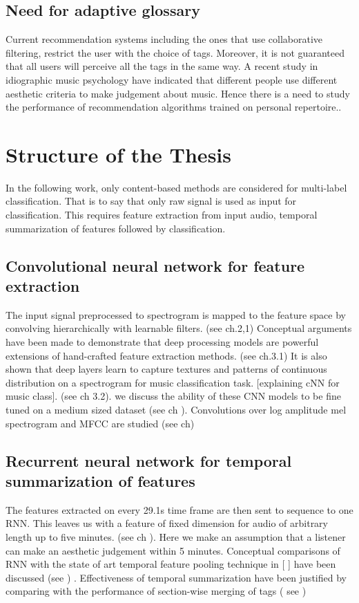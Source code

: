 \subsection{Need for adaptive glossary}
Current recommendation systems including the ones that use collaborative filtering, restrict the user with the choice of tags. Moreover, it is not guaranteed that all users will perceive all the tags in the same way. A recent study in idiographic music psychology have indicated that different people use different aesthetic criteria to make judgement about music\cite{NoAccountingForTaste}. Hence there is a need to study the performance of recommendation algorithms trained on personal repertoire..  




\section{Structure of the Thesis}
In the following work, only content-based methods are considered for multi-label classification. That is to say that only raw signal is used as input for classification. This requires feature extraction from input audio, temporal summarization of features followed by classification. 

\subsection{Convolutional neural network for feature extraction}
The input signal preprocessed to spectrogram is mapped to the feature space by convolving hierarchically with learnable filters. (see ch.2,1) Conceptual arguments have been made to demonstrate that deep processing models are powerful extensions of hand-crafted feature extraction methods\cite{Yann}. (see ch.3.1) It is also shown that deep layers learn to capture textures and patterns of continuous distribution on a spectrogram for music classification task. [explaining cNN for music class]. (see ch 3.2).  we discuss the ability of these CNN models to be fine tuned on a medium sized dataset (see ch ). Convolutions over log amplitude mel spectrogram and MFCC are studied (see ch)



\subsection{ Recurrent neural network for temporal summarization of features}
 The features extracted on every 29.1s time frame are then sent to sequence to one RNN. This leaves us with a feature of fixed dimension for audio of arbitrary length up to five minutes. (see ch ). Here we make an assumption that a listener can make an aesthetic judgement within 5 minutes. Conceptual comparisons of RNN with the state of art temporal feature pooling technique in [ ] have been discussed (see ) . Effectiveness of temporal summarization have been justified by comparing with the performance of section-wise merging of tags ( see )

